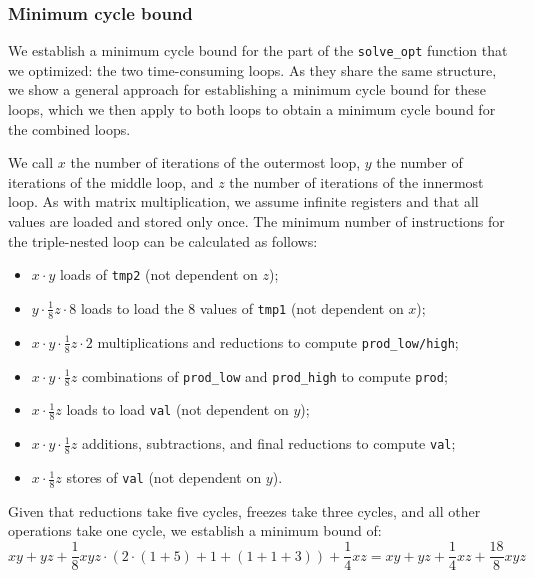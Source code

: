 \documentclass[11pt,a4paper]{report}
\theoremstyle{definition}
\begin{document}
\subsubsection{Minimum cycle bound}
We establish a minimum cycle bound for the part of the \texttt{solve\_opt} function that we optimized: the two time-consuming loops. As they share the same structure, we show a general approach for establishing a minimum cycle bound for these loops, which we then apply to both loops to obtain a minimum cycle bound for the combined loops.

We call $x$ the number of iterations of the outermost loop, $y$ the number of iterations of the middle loop, and $z$ the number of iterations of the innermost loop. As with matrix multiplication, we assume infinite registers and that all values are loaded and stored only once. The minimum number of instructions for the triple-nested loop can be calculated as follows:
\begin{itemize}
  \item $x \cdot y$ loads of \texttt{tmp2} (not dependent on $z$);
  \item $y \cdot \frac{1}{8}z \cdot 8$ loads to load the 8 values of \texttt{tmp1} (not dependent on $x$);
  \item $x \cdot y \cdot \frac{1}{8}z \cdot 2$ multiplications and reductions to compute \texttt{prod\_low/high};
  \item $x \cdot y \cdot \frac{1}{8}z$ combinations of \texttt{prod\_low} and \texttt{prod\_high} to compute \texttt{prod};
  \item $x \cdot \frac{1}{8}z$ loads to load \texttt{val} (not dependent on $y$);
  \item $x \cdot y \cdot \frac{1}{8}z$ additions, subtractions, and final reductions to compute \texttt{val};
  \item $x \cdot \frac{1}{8}z$ stores of \texttt{val} (not dependent on $y$).
\end{itemize}
Given that reductions take five cycles, freezes take three cycles, and all other operations take one cycle, we establish a minimum bound of:
\[
  xy + yz + \frac{1}{8}xyz \cdot (2 \cdot (1 + 5) + 1 + (1 + 1 + 3)) + \frac{1}{4}xz = xy + yz + \frac{1}{4}xz + \frac{18}{8}xyz
\]

\end{document}
